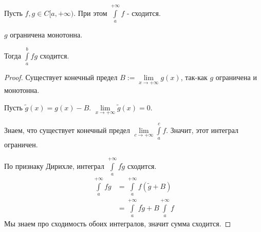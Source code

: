 \begin{theorem} \thmslashn

    Пусть $f, g\in C[a, +\infty)$. При этом $\int\limits_{a}^{+\infty} f \text{ - сходится}$.

    $g$ ограничена монотонна.

    Тогда $\int\limits_{a}^{b} fg$ сходится.
    \begin{proof}
        Существует конечный предел $B := \lim\limits_{x \to +\infty} g(x)$, так-как $g$ ограничена и монотонна.

        Пусть $\tilde{g}(x) = g(x) - B$. $\lim\limits_{x \to +\infty} \tilde{g}(x) = 0$.

        Знаем, что существует конечный предел $\lim\limits_{c \to +\infty} \int\limits_{a}^{c} f $. Значит, этот интеграл ограничен.

        По признаку Дирихле, интеграл $\int\limits_{a}^{+\infty} f \tilde{g} $ сходится.
        \begin{equation*}
            \begin{split}
                \int\limits_{a}^{+\infty} fg 
                &= \int\limits_{a}^{+\infty} f(\tilde{g} + B)\\ 
                &= \int\limits_{a}^{+\infty} f\tilde{g} + B \int\limits_{a}^{+\infty} f  
            \end{split}
        \end{equation*} 
        Мы знаем про сходимость обоих интегралов, значит сумма сходится.
    \end{proof}
\end{theorem}
